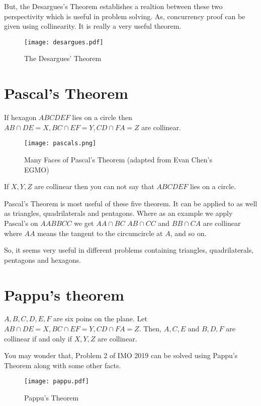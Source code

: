 But, the Desargues's Theorem establishes a realtion between these two perspectivity which is useful in problem solving. 
As, concurrency proof can be given using collinearity.
It is really a very useful theorem. 
\begin{figure}[ht]
\centering
	\texttt{[image: desargues.pdf]}
	\caption{The Desargues' Theorem}
\end{figure}


\section{Pascal's Theorem}
\begin{theorem}
If hexagon $ABCDEF$ lies on a circle then $AB\cap DE=X, BC\cap EF =Y, CD\cap FA=Z$ are collinear.
\end{theorem}

\begin{figure}[ht]
\centering
	\texttt{[image: pascals.png]}
	\caption{Many Faces of Pascal's Theorem (adapted from Evan Chen's EGMO)}
\end{figure}

\begin{remark*}
If $X,Y,Z$ are collinear then you can not say that $ABCDEF$ lies on a circle.
\end{remark*}
Pascal's Theorem is most useful of these five theorem. It can be applied to as well as triangles, quadrilaterals and pentagons.
Where as an example we apply Pascal's on $AABBCC$ we get $AA\cap BC $ $AB \cap CC$ and $BB \cap CA$ are collinear where $AA$ means the tangent to the circumcircle at $A$, and so on.

So, it seems very useful in different problems containing triangles, quadrilaterals, pentagons and hexagons.


\section{Pappu's theorem}
\begin{theorem}
$A,B,C,D,E,F$ are six poins on the plane. Let $AB\cap DE=X, BC\cap EF =Y, CD\cap FA=Z$. Then, $A,C,E$ and $B,D,F$ are collinear if and only if $X,Y,Z$ are collinear.
\end{theorem}
You may wonder that, Problem 2 of IMO 2019 can be solved using Pappu's Theorem along with some other facts.
\begin{figure}[ht]
\centering
	\texttt{[image: pappu.pdf]}
	\caption{Pappu's Theorem}
\end{figure}

